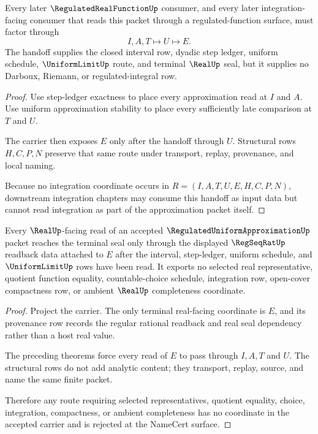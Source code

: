 \begin{theorem}
\label{thm:regulated-uniform-approximation-uniform-limit-handoff}
Every later $\RegulatedRealFunctionUp$ consumer, and every later integration-facing consumer that reads this packet through a regulated-function surface, must factor through
$$
I,A,T \longmapsto U \longmapsto E .
$$
The handoff supplies the closed interval row, dyadic step ledger, uniform schedule, $\UniformLimitUp$ route, and terminal $\RealUp$ seal, but it supplies no Darboux, Riemann, or regulated-integral row.
\end{theorem}
\begin{proof}
Use step-ledger exactness to place every approximation read at $I$ and $A$. Use uniform approximation stability to place every sufficiently late comparison at $T$ and $U$.

The carrier then exposes $E$ only after the handoff through $U$. Structural rows $H,C,P,N$ preserve that same route under transport, replay, provenance, and local naming.

Because no integration coordinate occurs in $R=(I,A,T,U,E,H,C,P,N)$, downstream integration chapters may consume this handoff as input data but cannot read integration as part of the approximation packet itself.
\end{proof}

\begin{theorem}
\label{thm:regulated-uniform-approximation-nonescape}
Every $\RealUp$-facing read of an accepted $\RegulatedUniformApproximationUp$ packet reaches the terminal seal only through the displayed $\RegSeqRatUp$ readback data attached to $E$ after the interval, step-ledger, uniform schedule, and $\UniformLimitUp$ rows have been read. It exports no selected real representative, quotient function equality, countable-choice schedule, integration row, open-cover compactness row, or ambient $\RealUp$ completeness coordinate.
\end{theorem}
\begin{proof}
Project the carrier. The only terminal real-facing coordinate is $E$, and its provenance row records the regular rational readback and real seal dependency rather than a host real value.

The preceding theorems force every read of $E$ to pass through $I,A,T$ and $U$. The structural rows do not add analytic content; they transport, replay, source, and name the same finite packet.

Therefore any route requiring selected representatives, quotient equality, choice, integration, compactness, or ambient completeness has no coordinate in the accepted carrier and is rejected at the NameCert surface.
\end{proof}


